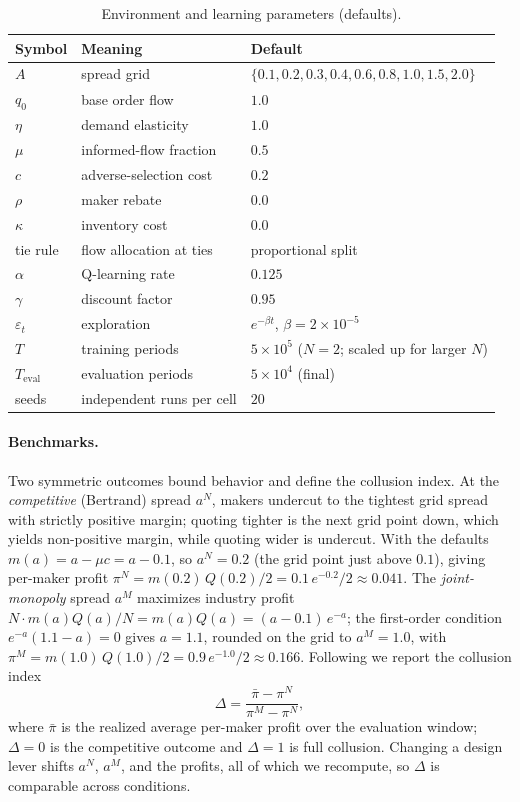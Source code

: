 \documentclass[sigconf]{acmart}
\begin{document}
\begin{table}[t]
\caption{Environment and learning parameters (defaults).}
\label{tab:params}
\small
\begin{tabular}{@{}lll@{}}
\toprule
Symbol & Meaning & Default \\
\midrule
$A$ & spread grid & $\{0.1,0.2,0.3,0.4,0.6,0.8,1.0,1.5,2.0\}$ \\
$q_0$ & base order flow & $1.0$ \\
$\eta$ & demand elasticity & $1.0$ \\
$\mu$ & informed-flow fraction & $0.5$ \\
$c$ & adverse-selection cost & $0.2$ \\
$\rho$ & maker rebate & $0.0$ \\
$\kappa$ & inventory cost & $0.0$ \\
tie rule & flow allocation at ties & proportional split \\
\midrule
$\alpha$ & Q-learning rate & $0.125$ \\
$\gamma$ & discount factor & $0.95$ \\
$\varepsilon_t$ & exploration & $e^{-\beta t}$, $\beta=2\times10^{-5}$ \\
$T$ & training periods & $5\times10^{5}$ ($N{=}2$; scaled up for larger $N$) \\
$T_{\text{eval}}$ & evaluation periods & $5\times10^{4}$ (final) \\
seeds & independent runs per cell & $20$ \\
\bottomrule
\end{tabular}
\end{table}

\paragraph{Benchmarks.} Two symmetric outcomes bound behavior and define the collusion index. At the \emph{competitive} (Bertrand) spread $a^N$, makers undercut to the tightest grid spread with strictly positive margin; quoting tighter is the next grid point down, which yields non-positive margin, while quoting wider is undercut. With the defaults $m(a) = a - \mu c = a - 0.1$, so $a^N = 0.2$ (the grid point just above $0.1$), giving per-maker profit $\pi^N = m(0.2)\,Q(0.2)/2 = 0.1\, e^{-0.2}/2 \approx 0.041$. The \emph{joint-monopoly} spread $a^M$ maximizes industry profit $N \cdot m(a)Q(a)/N = m(a)Q(a) = (a-0.1)\,e^{-a}$; the first-order condition $e^{-a}(1.1 - a) = 0$ gives $a = 1.1$, rounded on the grid to $a^M = 1.0$, with $\pi^M = m(1.0)\,Q(1.0)/2 = 0.9\,e^{-1.0}/2 \approx 0.166$. Following \cite{calvano2020} we report the collusion index
\[
\Delta = \frac{\bar\pi - \pi^{N}}{\pi^{M} - \pi^{N}},
\]
where $\bar\pi$ is the realized average per-maker profit over the evaluation window; $\Delta = 0$ is the competitive outcome and $\Delta = 1$ is full collusion. Changing a design lever shifts $a^N$, $a^M$, and the profits, all of which we recompute, so $\Delta$ is comparable across conditions.
\end{document}

